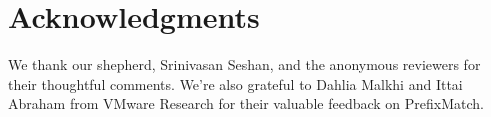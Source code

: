 
\smallskip 

\section*{Acknowledgments}

We thank our shepherd, Srinivasan Seshan, and the anonymous reviewers for their thoughtful comments. We're also grateful to Dahlia Malkhi and Ittai Abraham from VMware Research for their valuable feedback on PrefixMatch.